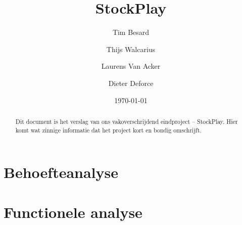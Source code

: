 \documentclass{article}
\makeatletter
\def\s@btitle{\relax}
\def\subtitle#1{\gdef\s@btitle{#1}}
\makeatother
\begin{document}
\title{StockPlay}
\subtitle{Vakoverschrijdend Eindproject}
\author{Tim Besard
\and Thijs Walcarius
\and Laurens Van Acker
\and Dieter Deforce}
\date{\today}
\maketitle

\parskip 7.2pt


%
%

\begin{abstract}
Dit document is het verslag van ons vakoverschrijdend eindproject -- StockPlay.
Hier komt wat zinnige informatie dat het project kort en bondig omschrijft.
\end{abstract}

\newpage
\section{Behoefteanalyse}


\newpage
\section{Functionele analyse}



%
%
\end{document}
